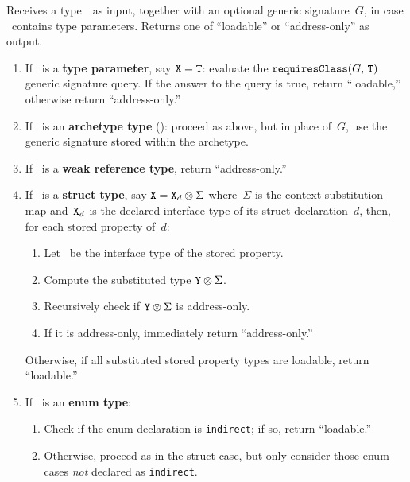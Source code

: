 \documentclass[../generics]{subfiles}
\begin{document}
\begin{algorithm}\label{alg:lowered type category}
Receives a type~\tX\ as input, together with an optional generic signature~$G$, in case \tX\ contains type parameters. Returns one of ``loadable'' or ``address-only'' as output.
\begin{enumerate}
\item If \tX\ is a \textbf{type parameter}, say $\texttt{X} = \texttt{T}$: evaluate the $\texttt{requiresClass}(G,\,\texttt{T})$ generic signature query. If the answer to the query is true, return ``loadable,'' otherwise return ``address-only.''
\item If \tX\ is an \textbf{archetype type} (): proceed as above, but in place of~$G$, use the generic signature stored within the archetype.
\item If \tX\ is a \textbf{weak reference type}, return ``address-only.''
\item If \tX\ is a \textbf{struct type}, say $\texttt{X} = \texttt{X}_d \otimes \Sigma$ where~$\Sigma$ is the context substitution map and~$\texttt{X}_d$ is the declared interface type of its struct declaration~$d$, then, for each stored property of~$d$:
\begin{enumerate}
\item Let \tY\ be the interface type of the stored property.
\item Compute the substituted type $\texttt{Y} \otimes \Sigma$.
\item Recursively check if $\texttt{Y} \otimes \Sigma$ is address-only.
\item If it is address-only, immediately return ``address-only.''
\end{enumerate}
Otherwise, if all substituted stored property types are loadable, return ``loadable.''

\item If \tX\ is an \textbf{enum type}:
\begin{enumerate}
\item Check if the enum declaration is \texttt{indirect}; if so, return ``loadable.''
\item Otherwise, proceed as in the struct case, but only consider those enum cases \emph{not} declared as \texttt{indirect}.


\end{enumerate}
\end{enumerate}
\end{algorithm}
\end{document}
